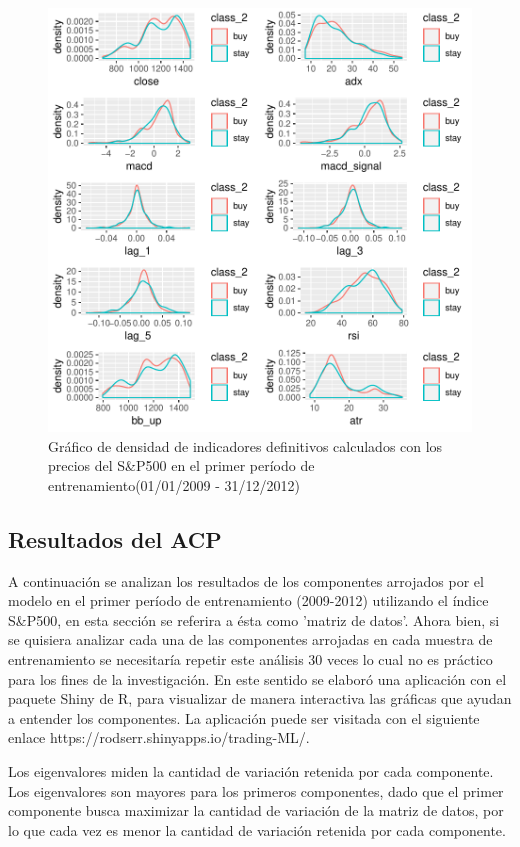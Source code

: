 \documentclass[a4paper,12pt]{Latex/Classes/PhDthesisPSnPDF}
\begin{document}
\begin{figure}[H]
\centering
\includegraphics{main-011}
\caption{Gráfico de densidad de indicadores definitivos calculados con los precios del S\&P500 en el primer período de entrenamiento(01/01/2009 - 31/12/2012)}
\end{figure}

\subsection{Resultados del ACP}

A continuación se analizan los resultados de los componentes arrojados por el modelo en el primer período de entrenamiento (2009-2012) utilizando el índice S\&P500, en esta sección se referira a ésta como 'matriz de datos'. Ahora bien, si se quisiera analizar cada una de las componentes arrojadas en cada muestra de entrenamiento se necesitaría repetir este análisis 30 veces lo cual no es práctico para los fines de la investigación. En este sentido se elaboró una aplicación con el paquete Shiny de R, para visualizar de manera interactiva las gráficas que ayudan a entender los componentes. La aplicación puede ser visitada con el siguiente enlace https://rodserr.shinyapps.io/trading-ML/.


Los eigenvalores miden la cantidad de variación retenida por cada componente. Los eigenvalores son mayores para los primeros componentes, dado que el primer componente busca maximizar la cantidad de variación de la matriz de datos, por lo que cada vez es menor la cantidad de variación retenida por cada componente.
\end{document}
